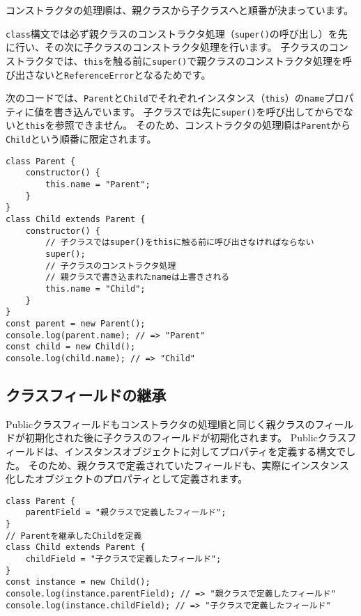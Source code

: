 コンストラクタの処理順は、親クラスから子クラスへと順番が決まっています。

\texttt{class}構文では必ず親クラスのコンストラクタ処理（\texttt{super()}の呼び出し）を先に行い、その次に子クラスのコンストラクタ処理を行います。
子クラスのコンストラクタでは、\texttt{this}を触る前に\texttt{super()}で親クラスのコンストラクタ処理を呼び出さないと\texttt{ReferenceError}となるためです。

次のコードでは、\texttt{Parent}と\texttt{Child}でそれぞれインスタンス（\texttt{this}）の\texttt{name}プロパティに値を書き込んでいます。
子クラスでは先に\texttt{super()}を呼び出してからでないと\texttt{this}を参照できません。
そのため、コンストラクタの処理順は\texttt{Parent}から\texttt{Child}という順番に限定されます。

\begin{lstlisting}
class Parent {
    constructor() {
        this.name = "Parent";
    }
}
class Child extends Parent {
    constructor() {
        // 子クラスではsuper()をthisに触る前に呼び出さなければならない
        super();
        // 子クラスのコンストラクタ処理
        // 親クラスで書き込まれたnameは上書きされる
        this.name = "Child";
    }
}
const parent = new Parent();
console.log(parent.name); // => "Parent"
const child = new Child();
console.log(child.name); // => "Child"
\end{lstlisting}

\hypertarget{class-fields-inheritance}{%
\subsection{クラスフィールドの継承}\label{class-fields-inheritance}}

Publicクラスフィールドもコンストラクタの処理順と同じく親クラスのフィールドが初期化された後に子クラスのフィールドが初期化されます。
Publicクラスフィールドは、インスタンスオブジェクトに対してプロパティを定義する構文でした。
そのため、親クラスで定義されていたフィールドも、実際にインスタンス化したオブジェクトのプロパティとして定義されます。

\begin{lstlisting}
class Parent {
    parentField = "親クラスで定義したフィールド";
}
// Parentを継承したChildを定義
class Child extends Parent {
    childField = "子クラスで定義したフィールド";
}
const instance = new Child();
console.log(instance.parentField); // => "親クラスで定義したフィールド"
console.log(instance.childField); // => "子クラスで定義したフィールド"
\end{lstlisting}

